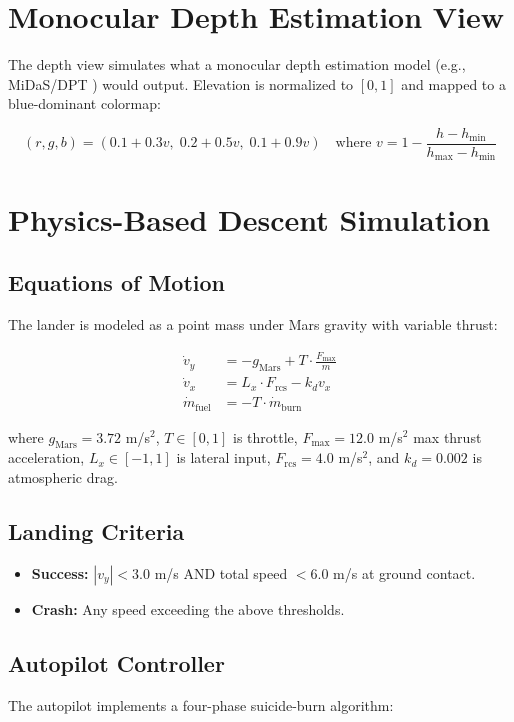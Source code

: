 \section{Monocular Depth Estimation View}
The depth view simulates what a monocular depth estimation model (e.g., MiDaS/DPT \cite{ranftl2021dpt}) would output. Elevation is normalized to $[0,1]$ and mapped to a blue-dominant colormap:

\begin{equation}
(r,g,b) = (0.1 + 0.3v,\; 0.2 + 0.5v,\; 0.1 + 0.9v) \quad \text{where } v = 1 - \frac{h - h_{\min}}{h_{\max} - h_{\min}}
\end{equation}

\section{Physics-Based Descent Simulation}

\subsection{Equations of Motion}
The lander is modeled as a point mass under Mars gravity with variable thrust:

\begin{align}
\dot{v}_y &= -g_{\text{Mars}} + T \cdot \frac{F_{\max}}{m} \label{eq:vy} \\
\dot{v}_x &= L_x \cdot F_{\text{rcs}} - k_d v_x \label{eq:vx} \\
\dot{m}_{\text{fuel}} &= -T \cdot \dot{m}_{\text{burn}} \label{eq:fuel}
\end{align}

where $g_{\text{Mars}} = 3.72$ m/s$^2$, $T \in [0,1]$ is throttle, $F_{\max} = 12.0$ m/s$^2$ max thrust acceleration, $L_x \in [-1,1]$ is lateral input, $F_{\text{rcs}} = 4.0$ m/s$^2$, and $k_d = 0.002$ is atmospheric drag.

\subsection{Landing Criteria}
\begin{itemize}
    \item \textbf{Success:} $|v_y| < 3.0$ m/s AND total speed $< 6.0$ m/s at ground contact.
    \item \textbf{Crash:} Any speed exceeding the above thresholds.
\end{itemize}

\subsection{Autopilot Controller}
The autopilot implements a four-phase suicide-burn algorithm:

